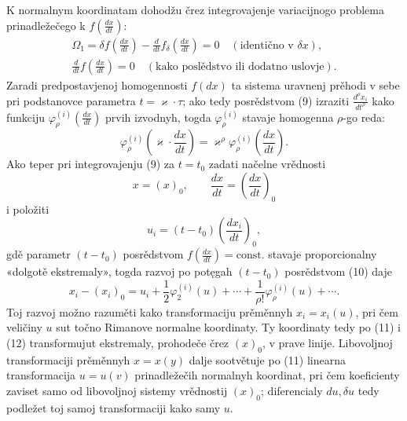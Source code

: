 \documentclass[11pt]{article}
\begin{document}
K normalnym koordinatam dohodžu črez integrovajenje variacijnogo problema prinadležečego k \(f\!\left(\frac{dx}{dt}\right)\):
\begin{equation}
\begin{gathered}
\Omega_1=\delta f\!\left(\frac{dx}{dt}\right)
-\frac{d}{dt}f_\delta\!\left(\frac{dx}{dt}\right)=0
\quad(\text{identično v }\delta x),\\
\frac{d}{dt}f\!\left(\frac{dx}{dt}\right)=0
\quad(\text{kako poslědstvo ili dodatno uslovje}).
\end{gathered}
\tag{9}
\end{equation}
Zaradi predpostavjenoj homogennosti \(f(dx)\) ta sistema uravnenj prěhodi v sebe pri podstanovce parametra \(t=\varkappa\cdot\tau\); ako tedy posrědstvom (9) izraziti \(\frac{d^\rho x_i}{dt^\rho}\) kako funkciju \(\varphi_\rho^{(i)}\!\left(\frac{dx}{dt}\right)\) prvih izvodnyh, togda \(\varphi_\rho^{(i)}\) stavaje homogenna \(\rho\)-go reda:
\begin{equation}
\varphi_\rho^{(i)}\!\left(\varkappa\cdot\frac{dx}{dt}\right)
=\varkappa^\rho\varphi_\rho^{(i)}\!\left(\frac{dx}{dt}\right).
\tag{10}
\end{equation}
Ako teper pri integrovajenju (9) za \(t=t_0\) zadati načelne vrědnosti
\[
x=(x)_0,\qquad \frac{dx}{dt}=\left(\frac{dx}{dt}\right)_0
\]
i položiti
\begin{equation}
u_i=(t-t_0)\left(\frac{dx_i}{dt}\right)_0,
\tag{11}
\end{equation}
gdě parametr \((t-t_0)\) posrědstvom \(f\!\left(\frac{dx}{dt}\right)=\mathrm{const.}\) stavaje proporcionalny «dolgotě ekstremaly», togda razvoj po potęgah \((t-t_0)\) posrědstvom (10) daje
\begin{equation}
x_i-(x_i)_0=u_i+\frac12\varphi_2^{(i)}(u)+\cdots+
\frac{1}{\rho!}\varphi_\rho^{(i)}(u)+\cdots .
\tag{12}
\end{equation}
Toj razvoj možno razuměti kako transformaciju prěměnnyh \(x_i=x_i(u)\), pri čem veličiny \(u\) sut točno Rimanove normalne koordinaty. Ty koordinaty tedy po (11) i (12) transformujut ekstremaly, prohodeče črez \((x)_0\), v prave linije. Libovoljnoj transformaciji prěměnnyh \(x=x(y)\) dalje sootvětuje po (11) linearna transformacija \(u=u(v)\) prinadležečih normalnyh koordinat, pri čem koeficienty zaviset samo od libovoljnoj sistemy vrědnostij \((x)_0\); diferencialy \(du,\delta u\) tedy podležet toj samoj transformaciji kako samy \(u\).
\end{document}
